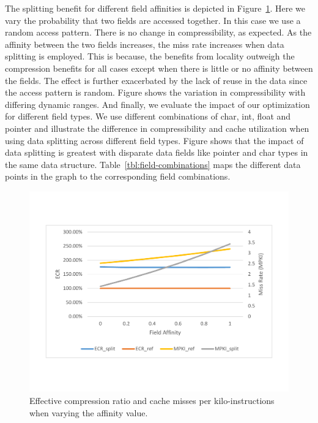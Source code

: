 The splitting benefit for different field affinities is depicted in
Figure~\ref{fig:affinity}.  Here we vary the probability that two fields are
accessed together. In this case we use a random access pattern. There is no
change in compressibility, as expected. As the affinity between the two fields
increases, the miss rate increases when data splitting is employed. This is
because, the benefits from locality outweigh the compression benefits for all
cases except when there is little or no affinity between the fields. The effect
is further exacerbated by the lack of reuse in the data since the access pattern
is random. Figure shows the variation in compressibility with differing dynamic
ranges. And finally, we evaluate the impact of our optimization for different
field types. We use different combinations of char, int, float and pointer and
illustrate the difference in compressibility and cache utilization when using
data splitting across different field types. Figure shows that the impact of
data splitting is greatest with disparate data fields like pointer and char
types in the same data structure. Table~\ref{tbl:field-combinations} maps the
different data points in the graph to the corresponding field combinations. 

\begin{figure}[htb]
\centering
\includegraphics[trim=0mm 0mm 0mm 0mm,clip,width=1\linewidth]{figs/figure.pdf}
\caption{Effective compression ratio and cache misses per kilo-instructions when varying the affinity value.}
\label{fig:affinity}
\end{figure}

